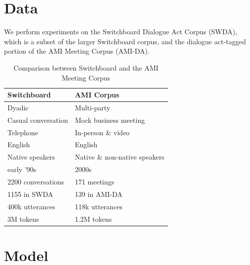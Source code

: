 \documentclass[11pt,a4paper]{article}
\begin{document}
\section{Data}
We perform experiments on the Switchboard Dialogue Act Corpus (SWDA), which is a subset of the larger Switchboard corpus, and the dialogue act-tagged portion of the AMI Meeting Corpus (AMI-DA).


\begin{table}[]
\centering
\begin{tabular}{@{}ll@{}}
\toprule
\textbf{Switchboard}       & \textbf{AMI Corpus}                     \\ \midrule
Dyadic                     & Multi-party                             \\
Casual conversation        & Mock business meeting                   \\
Telephone                  & In-person \& video                      \\ \midrule
English                    & English                                 \\ 
Native speakers            & Native \& non-native speakers           \\ 
early '90s                 & 2000s                                   \\ \midrule
2200 conversations         & 171 meetings                            \\
  \hspace{1em} 1155 in SWDA               & \hspace{1em} 139 in AMI-DA                           \\
400k utterances             & 118k utterances                         \\
3M tokens                  & 1.2M tokens                             \\ \bottomrule
\end{tabular}
  \caption{Comparison between Switchboard and the AMI Meeting Corpus}
  \label{table:corpora}
\end{table}

  
\section{Model} %
\end{document}
